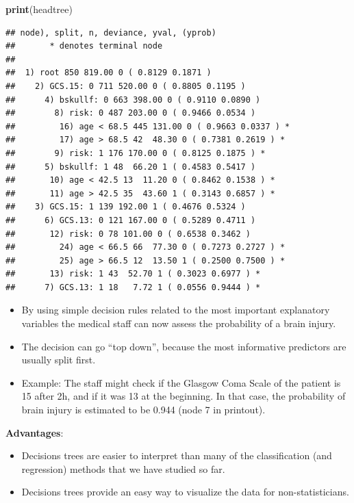 \documentclass[10pt,ignorenonframetext,]{beamer}
\newenvironment{Shaded}{\begin{snugshade}}{\end{snugshade}}
\newcommand{\KeywordTok}[1]{\textcolor[rgb]{0.13,0.29,0.53}{\textbf{#1}}}
\newcommand{\NormalTok}[1]{#1}
\begin{document}
\begin{frame}[fragile]

\footnotesize

\begin{Shaded}
\begin{Highlighting}[]
\KeywordTok{print}\NormalTok{(headtree)}
\end{Highlighting}
\end{Shaded}

\begin{verbatim}
## node), split, n, deviance, yval, (yprob)
##       * denotes terminal node
## 
##  1) root 850 819.00 0 ( 0.8129 0.1871 )  
##    2) GCS.15: 0 711 520.00 0 ( 0.8805 0.1195 )  
##      4) bskullf: 0 663 398.00 0 ( 0.9110 0.0890 )  
##        8) risk: 0 487 203.00 0 ( 0.9466 0.0534 )  
##         16) age < 68.5 445 131.00 0 ( 0.9663 0.0337 ) *
##         17) age > 68.5 42  48.30 0 ( 0.7381 0.2619 ) *
##        9) risk: 1 176 170.00 0 ( 0.8125 0.1875 ) *
##      5) bskullf: 1 48  66.20 1 ( 0.4583 0.5417 )  
##       10) age < 42.5 13  11.20 0 ( 0.8462 0.1538 ) *
##       11) age > 42.5 35  43.60 1 ( 0.3143 0.6857 ) *
##    3) GCS.15: 1 139 192.00 1 ( 0.4676 0.5324 )  
##      6) GCS.13: 0 121 167.00 0 ( 0.5289 0.4711 )  
##       12) risk: 0 78 101.00 0 ( 0.6538 0.3462 )  
##         24) age < 66.5 66  77.30 0 ( 0.7273 0.2727 ) *
##         25) age > 66.5 12  13.50 1 ( 0.2500 0.7500 ) *
##       13) risk: 1 43  52.70 1 ( 0.3023 0.6977 ) *
##      7) GCS.13: 1 18   7.72 1 ( 0.0556 0.9444 ) *
\end{verbatim}

\normalsize

\end{frame}

\begin{frame}

\begin{itemize}
\item
  By using simple decision rules related to the most important
  explanatory variables the medical staff can now assess the probability
  of a brain injury.
\item
  The decision can go ``top down'', because the most informative
  predictors are usually split first.
\item
  Example: The staff might check if the Glasgow Coma Scale of the
  patient is 15 after 2h, and if it was 13 at the beginning. In that
  case, the probability of brain injury is estimated to be 0.944 (node 7
  in printout).
\end{itemize}

\textbf{Advantages}:

\begin{itemize}
\item
  Decisions trees are easier to interpret than many of the
  classification (and regression) methods that we have studied so far.
\item
  Decisions trees provide an easy way to visualize the data for
  non-statisticians.
\end{itemize}

\end{frame}
\end{document}
